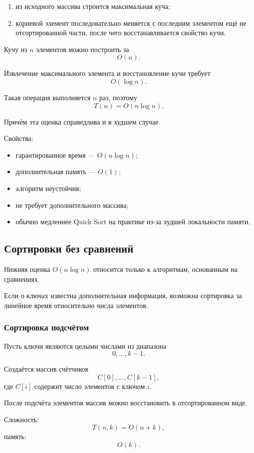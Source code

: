 \begin{enumerate}
	\item из исходного массива строится максимальная куча;
	\item корневой элемент последовательно меняется с последним элементом
	ещё не отсортированной части, после чего восстанавливается свойство кучи.
\end{enumerate}

Кучу из $n$ элементов можно построить за
\[
O(n).
\]

Извлечение максимального элемента и восстановление кучи требует
\[
O(\log n).
\]

Такая операция выполняется $n$ раз, поэтому
\[
T(n)=O(n\log n).
\]

Причём эта оценка справедлива и в худшем случае.

Свойства:
\begin{itemize}
	\item гарантированное время --- $O(n\log n)$;
	\item дополнительная память --- $O(1)$;
	\item алгоритм неустойчив;
	\item не требует дополнительного массива;
	\item обычно медленнее Quick Sort на практике из-за худшей локальности
	памяти.
\end{itemize}


\subsection{Сортировки без сравнений}

Нижняя оценка $O(n\log n)$ относится только к алгоритмам,
основанным на сравнениях.

Если о ключах известна дополнительная информация, возможна сортировка за
линейное время относительно числа элементов.

\subsubsection*{Сортировка подсчётом}

Пусть ключи являются целыми числами из диапазона
\[
0,\ldots,k-1.
\]

Создаётся массив счётчиков
\[
C[0],\ldots,C[k-1],
\]
где $C[i]$ содержит число элементов с ключом $i$.

После подсчёта элементов массив можно восстановить в отсортированном виде.

Сложность:
\[
T(n,k)=O(n+k),
\]
память:
\[
O(k).
\]

